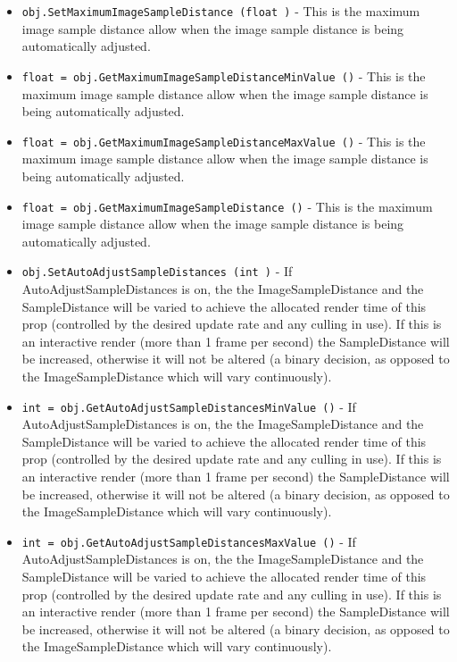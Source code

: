 \begin{itemize}
\item  \verb|obj.SetMaximumImageSampleDistance (float )| -  This is the maximum image sample distance allow when the image
 sample distance is being automatically adjusted.

\item  \verb|float = obj.GetMaximumImageSampleDistanceMinValue ()| -  This is the maximum image sample distance allow when the image
 sample distance is being automatically adjusted.

\item  \verb|float = obj.GetMaximumImageSampleDistanceMaxValue ()| -  This is the maximum image sample distance allow when the image
 sample distance is being automatically adjusted.

\item  \verb|float = obj.GetMaximumImageSampleDistance ()| -  This is the maximum image sample distance allow when the image
 sample distance is being automatically adjusted.

\item  \verb|obj.SetAutoAdjustSampleDistances (int )| -  If AutoAdjustSampleDistances is on, the the ImageSampleDistance
 and the SampleDistance will be varied to achieve the allocated 
 render time of this prop (controlled by the desired update rate 
 and any culling in use). If this is an interactive render (more 
 than 1 frame per second) the SampleDistance will be increased, 
 otherwise it will not be altered (a binary decision, as opposed
 to the ImageSampleDistance which will vary continuously).

\item  \verb|int = obj.GetAutoAdjustSampleDistancesMinValue ()| -  If AutoAdjustSampleDistances is on, the the ImageSampleDistance
 and the SampleDistance will be varied to achieve the allocated 
 render time of this prop (controlled by the desired update rate 
 and any culling in use). If this is an interactive render (more 
 than 1 frame per second) the SampleDistance will be increased, 
 otherwise it will not be altered (a binary decision, as opposed
 to the ImageSampleDistance which will vary continuously).

\item  \verb|int = obj.GetAutoAdjustSampleDistancesMaxValue ()| -  If AutoAdjustSampleDistances is on, the the ImageSampleDistance
 and the SampleDistance will be varied to achieve the allocated 
 render time of this prop (controlled by the desired update rate 
 and any culling in use). If this is an interactive render (more 
 than 1 frame per second) the SampleDistance will be increased, 
 otherwise it will not be altered (a binary decision, as opposed
 to the ImageSampleDistance which will vary continuously).


\end{itemize}
